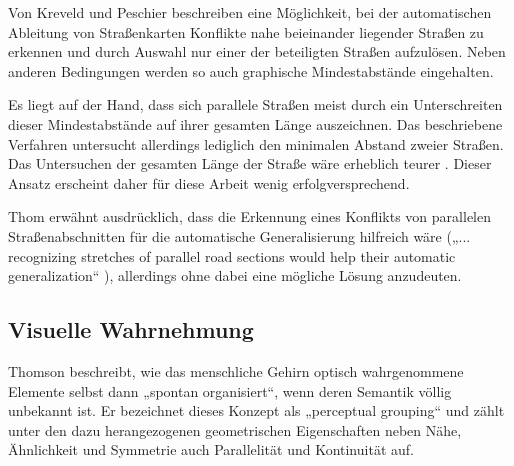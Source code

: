 \documentclass[../main/thesis.tex]{subfiles}
\begin{document}
Von Kreveld und Peschier beschreiben eine Möglichkeit, bei der automatischen Ableitung von Straßenkarten Konflikte nahe beieinander liegender Straßen zu erkennen und durch Auswahl nur einer der beteiligten Straßen aufzulösen. Neben anderen Bedingungen werden so auch graphische Mindestabstände eingehalten. 

Es liegt auf der Hand, dass sich parallele Straßen meist durch ein Unterschreiten dieser Mindestabstände auf ihrer gesamten Länge auszeichnen. Das beschriebene Verfahren untersucht allerdings lediglich den minimalen Abstand zweier Straßen. Das Untersuchen der gesamten Länge der Straße wäre erheblich teurer . Dieser Ansatz erscheint daher für diese Arbeit wenig erfolgversprechend.


Thom erwähnt ausdrücklich, dass die Erkennung eines Konflikts von parallelen Straßenabschnitten für die automatische Generalisierung hilfreich wäre („... recognizing stretches of parallel road sections would help their automatic generalization“ ), allerdings ohne dabei eine mögliche Lösung anzudeuten.


\subsection{Visuelle Wahrnehmung}


Thomson beschreibt, wie das menschliche Gehirn optisch wahrgenommene Elemente selbst dann „spontan organisiert“, wenn deren Semantik völlig unbekannt ist. Er bezeichnet dieses Konzept als „perceptual grouping“ und zählt unter den dazu herangezogenen geometrischen Eigenschaften neben Nähe, Ähnlichkeit und Symmetrie auch Parallelität und Kontinuität auf. 

\end{document}
